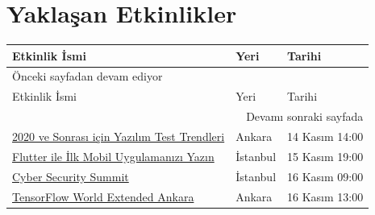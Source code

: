 \documentclass[11pt]{article}
\begin{document}
\section{Yaklaşan Etkinlikler}
\label{sec:org11c9cba}
\begin{longtable}{|p{8cm}|l|l|}
\hline
Etkinlik İsmi & Yeri & Tarihi\\
\hline
\endfirsthead
\multicolumn{3}{l}{Önceki sayfadan devam ediyor} \\
\hline

Etkinlik İsmi & Yeri & Tarihi \\

\hline
\endhead
\hline\multicolumn{3}{r}{Devamı sonraki sayfada} \\
\endfoot
\endlastfoot
\hline
\href{https://www.eventbrite.com/e/2020-ve-sonras-icin-yazlm-test-trendleri-tickets-78599383873}{2020 ve Sonrası için Yazılım Test Trendleri} & Ankara & 14 Kasım 14:00\\
\href{https://kommunity.com/devnot-yazilimci-bulusmalari/events/flutter-ile-ilk-mobil-uygulamanizi-yazin}{Flutter ile İlk Mobil Uygulamanızı Yazın} & İstanbul & 15 Kasım 19:00\\
\href{https://www.eventbrite.com/e/cyber-security-summit-tickets-73829151981}{Cyber Security Summit} & İstanbul & 16 Kasım 09:00\\
\href{https://kommunity.com/tensorflow-turkey/events/tensorflow-world-extended-ankara}{TensorFlow World Extended Ankara} & Ankara & 16 Kasım 13:00\\
\hline
\end{longtable}
\end{document}
